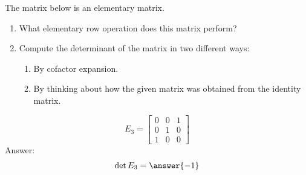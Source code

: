 \documentclass{ximera}
\begin{document}
  \begin{problem}\label{prob:elemmatdet3}
   The matrix below is an elementary matrix.
  \begin{enumerate}
  \item What elementary row operation does this matrix perform?
  \item Compute the determinant of the matrix in two different ways:
    \begin{enumerate}
    \item By cofactor expansion.
    \item By thinking about how the given matrix was obtained from the identity matrix.
    \end{enumerate}
  \end{enumerate}
  $$E_3=\begin{bmatrix}0&0&1\\0&1&0\\1&0&0\end{bmatrix}$$
   Answer: $$\det{E_3}=\answer{-1}$$
  \end{problem}

 
\end{document}
